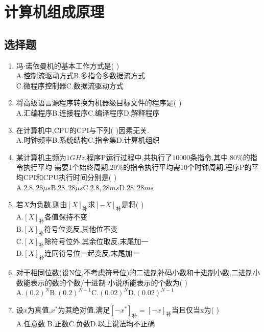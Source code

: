 \documentclass[12pt, a4paper, oneside, UTF8]{ctexbook}
\begin{document}
% 
\else
\fi
\chapter{计算机组成原理}

\section{选择题}
\begin{enumerate}
    \item 冯$\cdot$诺依曼机的基本工作方式是(  ) \\
    A.控制流驱动方式\qquad B.多指令多数据流方式 \\
    C.微程序控制器\qquad C.数据流驱动方式 
    
    \item \bt 将高级语言源程序转换为机器级目标文件的程序是(   ) \\
    A.汇编程序\qquad B.连接程序\qquad C.编译程序\qquad D.解释程序 

    \item 在计算机中,CPU的CPI与下列(   )因素无关.\\
    A.时钟频率\qquad B.系统结构\qquad C.指令集\qquad D.计算机组织 

    \item 某计算机主频为$1GHz$,程序P运行过程中,共执行了$10000$条指令,其中,$80\%$的指令执行平均
    需要1个始终周期,$20\%$的指令执行平均需10个时钟周期.程序P的平均CPI和CPU执行时间分别是(   ) \\
    A.$2.8,28\mu s$\qquad B.$28,28\mu s$\qquad C.$2.8,28ms$\qquad D.$28,28ms$ 

    \item 若$X$为负数,则由$[X]_{\text{补}}$求$[-X]_{\text{补}}$是将(   ) \\
    A.$[X]_{\text{补}}$各值保持不变 \\
    B.$[X]_{\text{补}}$符号位变反,其他位不变 \\
    C.$[X]_{\text{补}}$除符号位外,其余位取反,末尾加一 \\
    D.$[X]_{\text{补}}$连同符号位一起变反,末尾加一 

    \item 对于相同位数(设N位,不考虑符号位)的二进制补码小数和十进制小数,二进制小数能表示的数的个数/十进制
    小说所能表示的个数为(  ) \\
    A.$(0.2)^{N}$\qquad B.$(0.2)^{N-1}$\qquad C.$(0.02)^{N}$\qquad D.$(0.02)^{N-1}$ 

    \item 设$x$为真值,$x^{*}$为其绝对值,满足$[-x^*]_{\text{补}}=[-x]_{\text{补}}$当且仅当x为(   ) \\
    A.任意数 \qquad B.正数\qquad C.负数\qquad D.以上说法均不正确


\end{enumerate}
\end{document}
